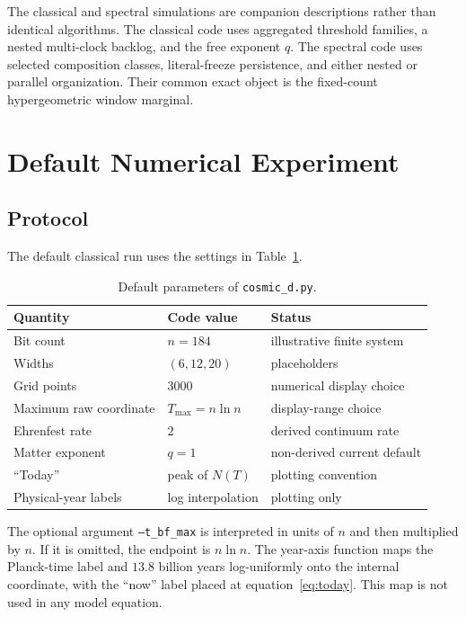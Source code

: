 \documentclass[11pt]{article}
\begin{document}
The classical and spectral simulations are companion descriptions rather
than identical algorithms.  The classical code uses aggregated threshold
families, a nested multi-clock backlog, and the free exponent $q$.  The
spectral code uses selected composition classes, literal-freeze persistence,
and either nested or parallel organization.  Their common exact object is
the fixed-count hypergeometric window marginal.

\section{Default Numerical Experiment}
\label{sec:numerics}

\subsection{Protocol}

The default classical run uses the settings in
Table~\ref{tab:defaults}.
\begin{table}[ht]
\centering
\caption{Default parameters of \texttt{cosmic\_d.py}.}
\label{tab:defaults}
\begin{tabular}{lll}
\toprule
Quantity & Code value & Status \\
\midrule
Bit count & $n=184$ & illustrative finite system \\
Widths & $(6,12,20)$ & placeholders \\
Grid points & $3000$ & numerical display choice \\
Maximum raw coordinate & $T_{\max}=n\ln n$ & display-range choice \\
Ehrenfest rate & $2$ & derived continuum rate \\
Matter exponent & $q=1$ & non-derived current default \\
``Today'' & peak of $N(T)$ & plotting convention \\
Physical-year labels & log interpolation & plotting only \\
\bottomrule
\end{tabular}
\end{table}

The optional argument \texttt{--t\_bf\_max} is interpreted in units of $n$
and then multiplied by $n$.  If it is omitted, the endpoint is $n\ln n$.
The year-axis function maps the Planck-time label and $13.8$ billion years
log-uniformly onto the internal coordinate, with the ``now'' label placed at
equation~\eqref{eq:today}.  This map is not used in any model equation.
\end{document}
